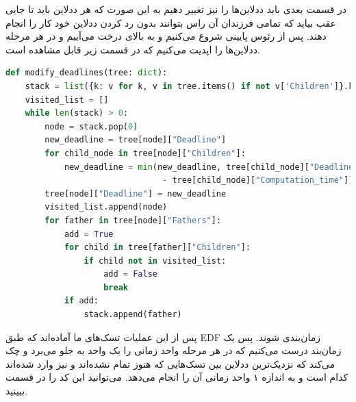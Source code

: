 در قسمت بعدی باید ددلاین‌ها را نیز تغییر دهیم به این صورت که 
هر ددلاین باید تا جایی عقب بیاید 
که تمامی فرزندان آن راس 
بتوانند بدون رد کردن ددلاین خود کار را انجام دهند.
پس از رئوس پایینی شروع می‌کنیم و به بالای درخت می‌آییم و 
در هر مرحله ددلاین‌ها را اپدیت می‌کنیم که در قسمت زیر قابل مشاهده است.

\begin{latin}
    \begin{lstlisting}[language=python,style=mystyle]
def modify_deadlines(tree: dict):
    stack = list({k: v for k, v in tree.items() if not v['Children']}.keys())
    visited_list = []
    while len(stack) > 0:
        node = stack.pop(0)
        new_deadline = tree[node]["Deadline"]
        for child_node in tree[node]["Children"]:
            new_deadline = min(new_deadline, tree[child_node]["Deadline"]
                                - tree[child_node]["Computation_time"])
        tree[node]["Deadline"] = new_deadline
        visited_list.append(node)
        for father in tree[node]["Fathers"]:
            add = True
            for child in tree[father]["Children"]:
                if child not in visited_list:
                    add = False
                    break
            if add:
                stack.append(father)
    \end{lstlisting}
\end{latin}

پس از این عملیات تسک‌های ما آماده‌اند که طبق 
EDF 
زمان‌بندی شوند.
پس یک زمان‌بند درست می‌کنیم که در هر مرحله 
واحد زمانی را یک واحد به جلو می‌برد و چک می‌کند که 
نزدیک‌ترین ددلاین بین تسک‌هایی که هنوز تمام نشده‌اند و نیز
وارد شده‌اند کدام است و به اندازه ۱ واحد زمانی آن را انجام می‌دهد.
می‌توانید این کد را در قسمت ببینید.

